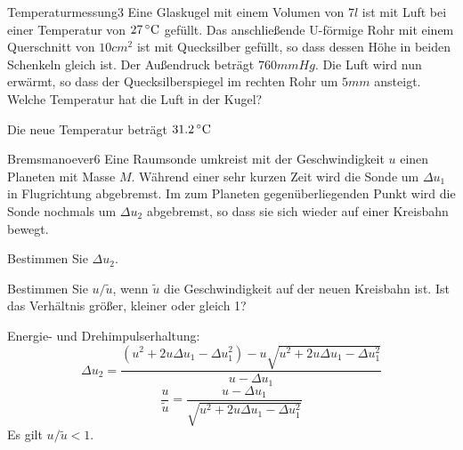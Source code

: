 



\begin{problem}{Temperaturmessung}{3}
Eine Glaskugel mit einem Volumen von $7\unit{l}$ ist mit Luft bei einer Temperatur
von $27\,^\circ\mathrm{C}$ gefüllt. Das anschließende U-förmige Rohr mit einem Querschnitt von $10\unit{cm^2}$
ist mit Quecksilber gefüllt, so dass dessen Höhe in beiden Schenkeln gleich ist. Der Außendruck
beträgt $760\unit{mmHg}$. Die Luft wird nun erwärmt, so dass der Quecksilberspiegel im rechten Rohr
um $5\unit{mm}$ ansteigt.\\
Welche Temperatur hat die Luft in der Kugel?
\begin{solution}
Die neue Temperatur beträgt $31.2\,^\circ\mathrm{C}$
\end{solution}
\end{problem}


\begin{problem}{Bremsmanoever}{6}
Eine Raumsonde umkreist mit der Geschwindigkeit $u$ einen Planeten mit Masse $M$.
Während einer sehr kurzen Zeit wird die Sonde um $\Delta u_1$ in Flugrichtung abgebremst.
Im zum Planeten gegenüberliegenden Punkt wird die Sonde nochmals um $\Delta u_2$ abgebremst,
so dass sie sich wieder auf einer Kreisbahn bewegt.
\begin{abcenum}
\item Bestimmen Sie $\Delta u_2$.
\item Bestimmen Sie $u/\tilde u$, wenn $\tilde u$ die Geschwindigkeit auf der neuen Kreisbahn ist. Ist das Verhältnis größer, kleiner oder gleich 1?
\end{abcenum}
\begin{solution}
Energie- und Drehimpulserhaltung:
\[
\Delta u_2=\frac{(u^2+2u\Delta u_1-\Delta u_1^2)-u\sqrt{u^2+2u\Delta u_1-\Delta u_1^2}}{u-\Delta u_1}
\]
\[
\frac{u}{\tilde{u}}=\frac{u-\Delta u_1}{\sqrt{u^2+2u\Delta u_1-\Delta u_1^2}}
\]
Es gilt $u/\tilde u<1$.
\end{solution}
\end{problem}


